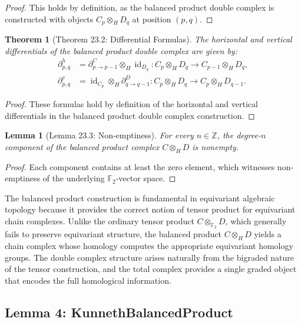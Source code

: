 \documentclass[11pt]{article}
\theoremstyle{plain}
\newtheorem*{theorem}{Theorem}
\newtheorem*{lemma}{Lemma}
\theoremstyle{definition}
\theoremstyle{remark}
\begin{document}
\begin{proof}
This holds by definition, as the balanced product double complex is constructed with objects $C_p \otimes_H D_q$ at position $(p,q)$.
\end{proof}

\begin{theorem}[Theorem 23.2: Differential Formulas]
The horizontal and vertical differentials of the balanced product double complex are given by:
\begin{align}
\partial^h_{p,q} &= \partial^C_{p \to p-1} \otimes_H \operatorname{id}_{D_q} : C_p \otimes_H D_q \to C_{p-1} \otimes_H D_q, \\
\partial^v_{p,q} &= \operatorname{id}_{C_p} \otimes_H \partial^D_{q \to q-1} : C_p \otimes_H D_q \to C_p \otimes_H D_{q-1}.
\end{align}
\end{theorem}

\begin{proof}
These formulas hold by definition of the horizontal and vertical differentials in the balanced product double complex construction.
\end{proof}

\begin{lemma}[Lemma 23.3: Non-emptiness]
For every $n \in \mathbb{Z}$, the degree-$n$ component of the balanced product complex $C \otimes_H D$ is nonempty.
\end{lemma}

\begin{proof}
Each component contains at least the zero element, which witnesses non-emptiness of the underlying $\mathbb{F}_2$-vector space.
\end{proof}

The balanced product construction is fundamental in equivariant algebraic topology because it provides the correct notion of tensor product for equivariant chain complexes. Unlike the ordinary tensor product $C \otimes_{\mathbb{F}_2} D$, which generally fails to preserve equivariant structure, the balanced product $C \otimes_H D$ yields a chain complex whose homology computes the appropriate equivariant homology groups. The double complex structure arises naturally from the bigraded nature of the tensor construction, and the total complex provides a single graded object that encodes the full homological information.

\vspace{1em}

\subsection{Lemma 4: KunnethBalancedProduct}
\end{document}

